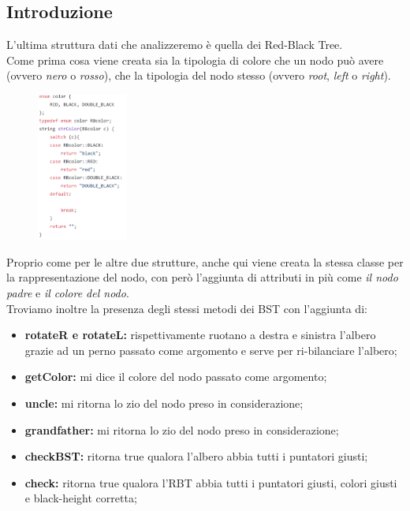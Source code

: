 \documentclass[a4paper]{article}
\begin{document}
			\subsection{Introduzione}
			L'ultima struttura dati che analizzeremo è quella dei Red-Black Tree.\\
			Come prima cosa viene creata sia la tipologia di colore che un nodo può avere (ovvero \textit{nero} o \textit{rosso}), che la tipologia del nodo stesso (ovvero \textit{root}, \textit{left} o \textit{right}).\\
			\begin{figure}[ht]
				\includegraphics[width=3cm]{Enum}
			\end{figure}
			Proprio come per le altre due strutture, anche qui viene creata la stessa classe per la rappresentazione del nodo, con però l'aggiunta di attributi in più come \textit{il nodo padre} e \textit{il colore del nodo}.\\
			Troviamo inoltre la presenza degli stessi metodi dei BST con l'aggiunta di:
			\begin{itemize}
				\item \textbf{rotateR e rotateL:} rispettivamente ruotano a destra e sinistra l'albero grazie ad un perno passato come argomento e serve per ri-bilanciare l'albero;
				\item \textbf{getColor:} mi dice il colore del nodo passato come argomento;
				\item \textbf{uncle:} mi ritorna lo zio del nodo preso in considerazione;
				\item \textbf{grandfather:} mi ritorna lo zio del nodo preso in considerazione;
				\item \textbf{checkBST:} ritorna true qualora l'albero abbia tutti i puntatori giusti;
				\item \textbf{check:} ritorna true qualora l'RBT abbia tutti i puntatori giusti, colori giusti e black-height corretta;
			\end{itemize}
			
			\newpage
\end{document}
